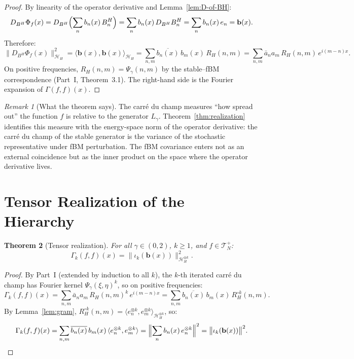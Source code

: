 \documentclass[11pt,a4paper]{article}
\theoremstyle{plain}
\newtheorem{theorem}{Theorem}[section]
\theoremstyle{definition}
\theoremstyle{remark}
\newtheorem{remark}[theorem]{Remark}
\newcommand{\HH}{\mathcal{H}_H}
\begin{document}
\begin{proof}
By linearity of the operator derivative and
Lemma~\ref{lem:D-of-BH}:
\[
  D_{B^H}\Phi_f(x)
  = D_{B^H}\Bigl(\sum_n b_n(x)\,B_n^H\Bigr)
  = \sum_n b_n(x)\,D_{B^H}B_n^H
  = \sum_n b_n(x)\,e_n
  = \mathbf{b}(x).
\]
Therefore:
\[
  \bigl\|D_{B^H}\Phi_f(x)\bigr\|^2_{\HH}
  = \langle \mathbf{b}(x), \mathbf{b}(x) \rangle_{\HH}
  = \sum_{n,m} \overline{b_n(x)}\,b_m(x)\,R_H(n,m)
  = \sum_{n,m} \bar{a}_n a_m\,R_H(n,m)\,e^{i(m-n)x}.
\]
On positive frequencies, $R_H(n,m) = \Psi_\gamma(n,m)$
by the stable--fBM correspondence (Part~I, Theorem~3.1).
The right-hand side is the Fourier expansion of
$\Gamma(f,f)(x)$.
\end{proof}

\begin{remark}[What the theorem says]\label{rem:what}
The carr\'e du champ measures ``how spread out'' the
function $f$ is relative to the generator $L_\gamma$.
Theorem~\ref{thm:realization} identifies this measure
with the energy-space norm of the operator derivative:
the carr\'e du champ of the stable generator is the
variance of the stochastic representative under fBM
perturbation.  The fBM covariance enters not as an
external coincidence but as the inner product on the
space where the operator derivative lives.
\end{remark}


\section{Tensor Realization of the Hierarchy}
\label{sec:tensor}

\begin{theorem}[Tensor realization]\label{thm:tensor}
For all $\gamma \in (0,2)$, $k \geq 1$, and
$f \in \mathcal{T}_N^+$:
\begin{equation}\label{eq:tensor}
  \Gamma_k(f,f)(x)
  = \bigl\|\iota_k(\mathbf{b}(x))\bigr\|^2_{\HH^{\otimes k}}.
\end{equation}
\end{theorem}

\begin{proof}
By Part~I (extended by induction to all $k$), the
$k$-th iterated carr\'e du champ has Fourier kernel
$\Psi_\gamma(\xi,\eta)^k$, so on positive frequencies:
\[
  \Gamma_k(f,f)(x)
  = \sum_{n,m} \bar{a}_n a_m\,R_H(n,m)^k\,e^{i(m-n)x}
  = \sum_{n,m} \overline{b_n(x)}\,b_m(x)\,
    R_H^{\circ k}(n,m).
\]
By Lemma~\ref{lem:gram},
$R_H^{\circ k}(n,m) = \langle e_n^{\otimes k},
e_m^{\otimes k} \rangle_{\HH^{\otimes k}}$, so:
\[
  \Gamma_k(f,f)(x)
  = \sum_{n,m} \overline{b_n(x)}\,b_m(x)\,
    \langle e_n^{\otimes k}, e_m^{\otimes k} \rangle
  = \Bigl\|\sum_n b_n(x)\,e_n^{\otimes k}\Bigr\|^2
  = \bigl\|\iota_k(\mathbf{b}(x))\bigr\|^2.
  \qedhere
\]
\end{proof}
\end{document}
